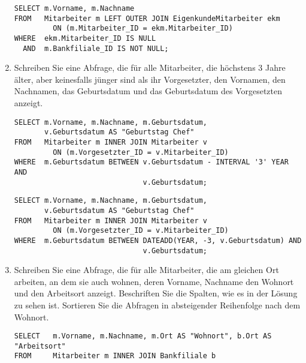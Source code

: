 \begin{enumerate}
        \begin{lstlisting}[language=oracle_sql]
SELECT m.Vorname, m.Nachname
FROM   Mitarbeiter m LEFT OUTER JOIN EigenkundeMitarbeiter ekm
         ON (m.Mitarbeiter_ID = ekm.Mitarbeiter_ID)
WHERE  ekm.Mitarbeiter_ID IS NULL
  AND  m.Bankfiliale_ID IS NOT NULL;
        \end{lstlisting}
        \item Schreiben Sie eine Abfrage, die für alle Mitarbeiter, die
        höchstens 3 Jahre älter, aber keinesfalls jünger sind als ihr
        Vorgesetzter, den Vornamen, den Nachnamen, das Geburtsdatum und das
        Geburtsdatum des Vorgesetzten anzeigt.
\clearpage
        \begin{oraclesql}[\FALSE]
        \end{oraclesql}
        \begin{lstlisting}[language=oracle_sql]
SELECT m.Vorname, m.Nachname, m.Geburtsdatum,
       v.Geburtsdatum AS "Geburtstag Chef"
FROM   Mitarbeiter m INNER JOIN Mitarbeiter v
         ON (m.Vorgesetzter_ID = v.Mitarbeiter_ID)
WHERE  m.Geburtsdatum BETWEEN v.Geburtsdatum - INTERVAL '3' YEAR AND
                              v.Geburtsdatum;
        \end{lstlisting}
        \begin{mssql}[\FALSE]
        \end{mssql}
        \begin{lstlisting}[language=ms_sql]
SELECT m.Vorname, m.Nachname, m.Geburtsdatum,
       v.Geburtsdatum AS "Geburtstag Chef"
FROM   Mitarbeiter m INNER JOIN Mitarbeiter v
         ON (m.Vorgesetzter_ID = v.Mitarbeiter_ID)
WHERE  m.Geburtsdatum BETWEEN DATEADD(YEAR, -3, v.Geburtsdatum) AND
                              v.Geburtsdatum;
        \end{lstlisting}
        \item Schreiben Sie eine Abfrage, die für alle Mitarbeiter, die am
        gleichen Ort arbeiten, an dem sie auch wohnen, deren Vorname, Nachname
        den Wohnort und den Arbeitsort anzeigt. Beschriften Sie die Spalten, wie
        es in der Lösung zu sehen ist. Sortieren Sie die Abfragen in
        absteigender Reihenfolge nach dem Wohnort.
        \begin{msoraclesql}[\FALSE]
        \end{msoraclesql}
        \begin{lstlisting}[language=oracle_sql]
SELECT   m.Vorname, m.Nachname, m.Ort AS "Wohnort", b.Ort AS "Arbeitsort"
FROM     Mitarbeiter m INNER JOIN Bankfiliale b

\end{lstlisting}
\end{enumerate}
